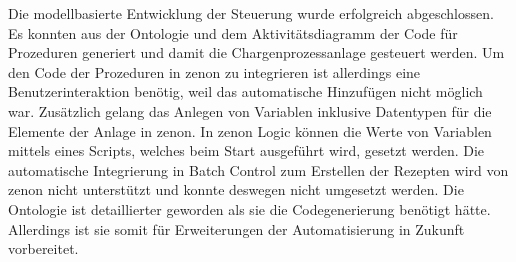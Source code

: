 Die modellbasierte Entwicklung der Steuerung wurde erfolgreich abgeschlossen. Es konnten aus der Ontologie und dem Aktivitätsdiagramm der Code für Prozeduren generiert und damit die Chargenprozessanlage gesteuert werden. Um den Code der Prozeduren in zenon zu integrieren ist allerdings eine Benutzerinteraktion benötig, weil das automatische Hinzufügen nicht möglich war. Zusätzlich gelang das Anlegen von Variablen inklusive Datentypen für die Elemente der Anlage in zenon. In zenon Logic können die Werte von Variablen mittels eines Scripts, welches beim Start ausgeführt wird, gesetzt werden. 
Die automatische Integrierung in Batch Control zum Erstellen der Rezepten wird von zenon nicht unterstützt und konnte deswegen nicht umgesetzt werden. 
Die Ontologie ist detaillierter geworden als sie die Codegenerierung benötigt hätte. Allerdings ist sie somit für Erweiterungen der Automatisierung in Zukunft vorbereitet. 


















